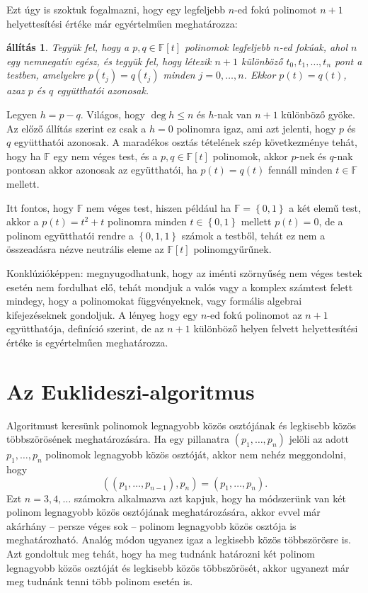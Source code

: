 \documentclass[a4paper, showtrims]{memoir}
\makeatletter
\renewenvironment{proof}[1][\proofname]
    {\par\pushQED{\qed}%
    \normalfont \topsep6\p@\@plus6\p@\relax
    \trivlist
    \item[\hskip\labelsep
        \itshape
    #1\@addpunct{:}]\ignorespaces}
    {\popQED\endtrivlist\@endpefalse}
\theoremstyle{plain}
\newtheorem{proposition}{állítás}[chapter]
\theoremstyle{remark}
\theoremstyle{definition}
\makeatother
\begin{document}
Ezt úgy is szoktuk fogalmazni,
hogy egy legfeljebb $n$-ed fokú polinomot $n+1$ helyettesítési értéke már egyértelműen meghatározza:
\begin{proposition}\label{pr:polinomfv}
	Tegyük fel, hogy a $p,q\in\mathbb{F}\left[ t \right]$ polinomok legfeljebb $n$-ed fokúak, ahol $n$ egy nemnegatív egész,
	és tegyük fel,
	hogy létezik $n+1$ különböző $t_0,t_1,\ldots,t_n$ pont a testben,
	amelyekre $p\left( t_j \right)=q\left( t_j \right)$ minden $j=0,\ldots,n$.
	Ekkor $p\left( t \right)=q\left( t \right)$,
	azaz $p$ és $q$ együtthatói azonosak.
\end{proposition}
\begin{proof}
	Legyen $h=p-q$.
	Világos, hogy $\deg h\leq n$ és $h$-nak van $n+1$ különböző gyöke.
	Az előző állítás szerint ez csak a $h=0$ polinomra igaz, ami azt jelenti,
	hogy $p$ és $q$ együtthatói azonosak.
\end{proof}
A maradékos osztás tételének szép következménye tehát,
hogy ha $\mathbb{F}$ egy nem véges test, és a $p,q\in\mathbb{F}\left[ t \right]$ polinomok,
akkor $p$-nek és $q$-nak pontosan akkor azonosak az együtthatói, ha
\(
p\left( t \right)=q\left( t \right)
\)
fennáll minden $t\in\mathbb{F}$ mellett.

Itt fontos, hogy $\mathbb{F}$ nem véges test,
hiszen például ha $\mathbb{F}=\left\{ 0,1 \right\}$ a két elemű test,
akkor a $p\left( t \right)=t^2+t$ polinomra minden $t\in\left\{ 0,1 \right\}$ mellett $p\left( t \right)=0$,
de a polinom együtthatói rendre a $\left\{ 0,1,1 \right\}$ számok a testből,
tehát ez nem a összeadásra nézve neutrális eleme az $\mathbb{F}\left[ t \right]$ polinomgyűrűnek.

Konklúzióképpen: megnyugodhatunk, hogy az iménti szörnyűség nem véges testek esetén nem fordulhat elő,
tehát mondjuk a valós vagy a komplex számtest felett mindegy,
hogy a polinomokat függvényeknek, vagy formális algebrai kifejezéseknek gondoljuk.
A lényeg hogy egy $n$-ed fokú polinomot az $n+1$ együtthatója, definíció szerint,
de az $n+1$ különböző helyen felvett helyettesítési értéke is egyértelműen meghatározza.

\section{Az Euklideszi-algoritmus}
Algoritmust keresünk polinomok legnagyobb közös osztójának és legkisebb közös többszörösének meghatározására.
Ha egy pillanatra $\left( p_1,\ldots,p_n \right)$ jelöli az adott $p_1,\ldots,p_n$ polinomok legnagyobb közös osztóját,
akkor nem nehéz meggondolni,
hogy
\[
	\left( \left( p_1,\ldots,p_{n-1} \right),p_n \right)=\left( p_1,\ldots,p_{n}\right).
\]
Ezt $n=3,4,\ldots$ számokra alkalmazva azt kapjuk,
hogy ha módszerünk van két polinom legnagyobb közös osztójának meghatározására,
akkor evvel már akárhány -- persze véges sok -- polinom legnagyobb közös osztója is meghatározható.
Analóg módon ugyanez igaz a legkisebb közös többszörösre is.
Azt gondoltuk meg tehát, hogy ha meg tudnánk határozni két polinom legnagyobb közös osztóját és legkisebb közös többszörösét,
akkor ugyanezt már meg tudnánk tenni több polinom esetén is.
\end{document}
